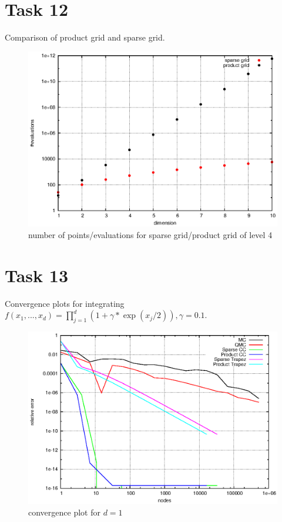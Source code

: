 \documentclass[]{article}
\begin{document}
\section*{Task 12}
Comparison of product grid and sparse grid.\\
\begin{figure}[!ht]
\centering
\includegraphics[width=.9\textwidth]{task12}
\caption{number of points/evaluations for sparse grid/product grid of level 4}
\label{fig:Task12}
\end{figure}
\clearpage

\section*{Task 13}
Convergence plots for integrating $f(x_1,...,x_d)=\prod_{j=1}^d (1+\gamma*\exp(x_j/2)),\gamma=0.1$.\\
\begin{figure}[!ht]
\centering
\includegraphics[width=.9\textwidth]{task13_d1}
\caption{convergence plot for $d=1$}
\label{fig:Task13a}
\end{figure}
\end{document}
